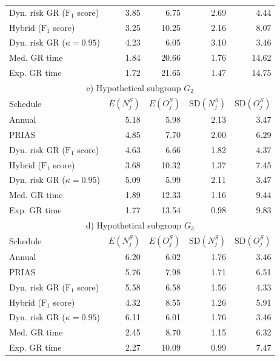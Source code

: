 \begin{table}[!htb]
\begin{tabular}{lrrrr}
Dyn. risk GR ($\mbox{F}_1$ score)       & 3.85            & 6.75                & 2.69          & 4.44              \\
Hybrid ($\mbox{F}_1$ score)       & 3.25            & 10.25               & 2.16          & 8.07              \\
Dyn. risk GR ($\kappa=0.95$) & 4.23 & 6.05 & 3.10 & 3.46\\
Med. GR time & 1.84            & 20.66               & 1.76          & 14.62             \\
Exp. GR time & 1.72            & 21.65               & 1.47          & 14.75             \\
\hline      
\multicolumn{5}{c}{c) Hypothetical subgroup $G_2$}\\
\hline
Schedule        & $E(N^S_j)$ & $E(O^S_j)$ & ${\mbox{SD}(N^S_j)}$ & ${\mbox{SD}(O^S_j)}$ \\
\hline
Annual         & 5.18            & 5.98                & 2.13          & 3.47              \\
PRIAS          & 4.85            & 7.70                & 2.00          & 6.29        \\
Dyn. risk GR ($\mbox{F}_1$ score)       & 4.63            & 6.66                & 1.82          & 4.37              \\
Hybrid ($\mbox{F}_1$ score)       & 3.68            & 10.32                & 1.37          & 7.45              \\
Dyn. risk GR ($\kappa=0.95$) & 5.09 & 5.99 & 2.11 & 3.47\\
Med. GR time & 1.89             & 12.33               & 1.16          & 9.44              \\
Exp. GR time & 1.77            & 13.54               & 0.98          & 9.83              \\
\hline      
\multicolumn{5}{c}{d) Hypothetical subgroup $G_3$}\\
\hline
Schedule        & $E(N^S_j)$ & $E(O^S_j)$ & ${\mbox{SD}(N^S_j)}$ & ${\mbox{SD}(O^S_j)}$ \\
\hline
Annual         & 6.20             & 6.02                & 1.76          & 3.46              \\
PRIAS          & 5.76             & 7.98                & 1.71         & 6.51        \\
Dyn. risk GR ($\mbox{F}_1$ score)       & 5.58            & 6.58                & 1.56          & 4.33              \\
Hybrid ($\mbox{F}_1$ score)       & 4.32            & 8.55                & 1.26          & 5.91              \\
Dyn. risk GR ($\kappa=0.95$) & 6.11 & 6.01 & 1.76 & 3.46\\
Med. GR time & 2.45            & 8.70                & 1.15          & 6.32              \\
Exp. GR time & 2.27            & 10.09               & 0.99          & 7.47              \\
\hline     
\end{tabular}
\end{table}


